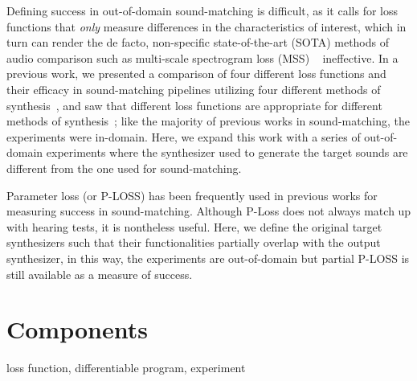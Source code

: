 \documentclass{article} %
\begin{document}
Defining success in out-of-domain sound-matching is difficult, as it calls for loss functions that \textit{only} measure differences in the characteristics of interest, which in turn can render the de facto, non-specific state-of-the-art (SOTA) methods of audio comparison such as multi-scale spectrogram loss (MSS) ~\cite{engel2020ddsp} ineffective. In a previous work, we presented a comparison of four different loss functions and their efficacy in sound-matching pipelines utilizing four different methods of synthesis~\cite{salimi2025soundmatching}, and saw that different loss functions are appropriate for different methods of synthesis~\cite{salimi2025soundmatching}; like the majority of previous works in sound-matching, the experiments were in-domain. Here, we expand this work with a series of out-of-domain experiments where the synthesizer used to generate the target sounds are different from the one used for sound-matching. 

Parameter loss (or P-LOSS) has been frequently used in previous works for measuring success in sound-matching. Although P-Loss does not always match up with hearing tests, it is nontheless useful. Here, we define the original target synthesizers such that their functionalities partially overlap with the output synthesizer, in this way, the experiments are out-of-domain but partial P-LOSS is still available as a measure of success. 






\section{Components}
loss function, differentiable program, experiment
\end{document}

